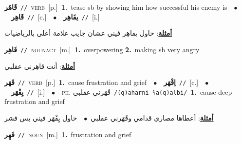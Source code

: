 \documentclass[10pt,a4paper,twoside]{article} %
\begin{document}
\begin{multicols}{2}
{\setlength\topsep{0pt}\textbf{\foreignlanguage{arabic}{قَاهَر}}\ {\color{gray}\texttt{//}\color{black}}\ \textsc{verb}\ [p.]\ \textbf{1.}~tease sb by showing him how successful his enemy is\ \ $\bullet$\ \ \setlength\topsep{0pt}\textbf{\foreignlanguage{arabic}{قَاهِر}}\ {\color{gray}\texttt{//}\color{black}}\ [c.]\ \ $\bullet$\ \ \setlength\topsep{0pt}\textbf{\foreignlanguage{arabic}{يقَاهِر}}\ {\color{gray}\texttt{//}\color{black}}\ [i.]\  \begin{flushright}\color{gray}\foreignlanguage{arabic}{\textbf{\underline{\foreignlanguage{arabic}{أمثلة}}}: حاول يقاهِر فيني عشان جايب علامة أعلى بالرياضيات}\end{flushright}\color{black}} \vspace{2mm}

{\setlength\topsep{0pt}\textbf{\foreignlanguage{arabic}{قَاهِر}}\ {\color{gray}\texttt{//}\color{black}}\ \textsc{noun\textunderscore act}\ [m.]\ \textbf{1.}~overpowering  \textbf{2.}~making sb very angry\  \begin{flushright}\color{gray}\foreignlanguage{arabic}{\textbf{\underline{\foreignlanguage{arabic}{أمثلة}}}: أنت قاهِرني عقلبي}\end{flushright}\color{black}} \vspace{2mm}

{\setlength\topsep{0pt}\textbf{\foreignlanguage{arabic}{قَهَر}}\ {\color{gray}\texttt{//}\color{black}}\ \textsc{verb}\ [p.]\ \textbf{1.}~cause frustration and grief\ \ $\bullet$\ \ \setlength\topsep{0pt}\textbf{\foreignlanguage{arabic}{اِقْهَر}}\ {\color{gray}\texttt{//}\color{black}}\ [c.]\ \ $\bullet$\ \ \setlength\topsep{0pt}\textbf{\foreignlanguage{arabic}{يِقْهَر}}\ {\color{gray}\texttt{//}\color{black}}\ [i.]\ \ $\bullet$\ \ \textsc{ph.} \color{gray} \foreignlanguage{arabic}{قَهَرني عقلبي}\color{black}\ {\color{gray}\texttt{/{\sffamily (q)aharni ʕa(q)albi}/}\color{black}}\ \textbf{1.}~cause deep frustration and grief\  \begin{flushright}\color{gray}\foreignlanguage{arabic}{\textbf{\underline{\foreignlanguage{arabic}{أمثلة}}}: أعطاها مصاري قدامي وقَهَرني عقلبي\ $\bullet$\ \  حاول يِقْهَر فيني بس فشر}\end{flushright}\color{black}} \vspace{2mm}

{\setlength\topsep{0pt}\textbf{\foreignlanguage{arabic}{قَهِر}}\ {\color{gray}\texttt{//}\color{black}}\ \textsc{noun}\ [m.]\ \textbf{1.}~frustration and grief\ } \vspace{2mm}


\end{multicols}
\end{document}
